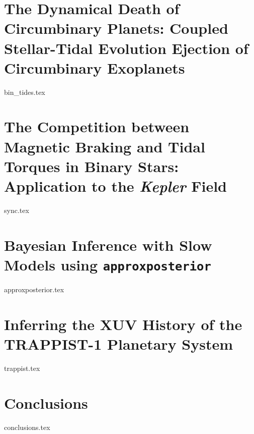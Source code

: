 \documentclass [11pt, proquest]{uwthesis} %
\newcommand{\approxposterior}[0]{\texttt{approxposterior}\xspace}
\newcommand{\kepler}[0]{\textit{Kepler}\xspace}
\begin{document}
\chapter{The Dynamical Death of Circumbinary Planets: Coupled Stellar-Tidal Evolution Ejection of Circumbinary Exoplanets}
{bin_tides.tex}

\chapter{The Competition between Magnetic Braking and Tidal Torques in Binary Stars: Application to the \kepler Field}
{sync.tex}

\chapter{Bayesian Inference with Slow Models using \approxposterior}
{approxposterior.tex}

\chapter{Inferring the XUV History of the TRAPPIST-1 Planetary System}
{trappist.tex}

\chapter{Conclusions}
{conclusions.tex}

\printendnotes

%
%

%
%

\appendix
\raggedbottom\sloppy
\end{document}
